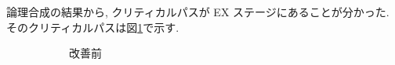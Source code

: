 \documentclass[../improvements.tex]{subfiles}
\begin{document}
  論理合成の結果から, クリティカルパスが EX ステージにあることが分かった.
  そのクリティカルパスは図\ref{fig:critical-path-before}で示す.

  \begin{figure}[h]
    \centering
    \begin{subfigure}{\columnwidth}
      \centering
      \caption{改善前}
      \label{fig:critical-path-before}
    \end{subfigure}
    \begin{subfigure}{\columnwidth}
      \centering
      \resizebox{0.5\columnwidth}{!}{
}
\end{subfigure}
\end{figure}
\end{document}
